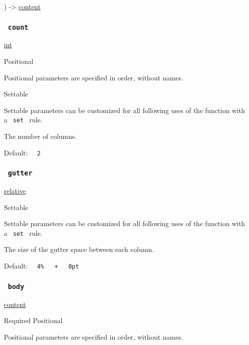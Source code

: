 ) -\textgreater{} \href{/docs/reference/foundations/content/}{content}

\subsubsection{\texorpdfstring{\texttt{\ count\ }}{ count }}\label{parameters-count}

\href{/docs/reference/foundations/int/}{int}

{{ Positional }}

\label{parameters-count-positional-tooltip}
Positional parameters are specified in order, without names.

{{ Settable }}

\label{parameters-count-settable-tooltip}
Settable parameters can be customized for all following uses of the
function with a \texttt{\ set\ } rule.

The number of columns.

Default: \texttt{\ }{\texttt{\ 2\ }}\texttt{\ }

\subsubsection{\texorpdfstring{\texttt{\ gutter\ }}{ gutter }}\label{parameters-gutter}

\href{/docs/reference/layout/relative/}{relative}

{{ Settable }}

\label{parameters-gutter-settable-tooltip}
Settable parameters can be customized for all following uses of the
function with a \texttt{\ set\ } rule.

The size of the gutter space between each column.

Default:
\texttt{\ }{\texttt{\ 4\%\ }}\texttt{\ }{\texttt{\ +\ }}\texttt{\ }{\texttt{\ 0pt\ }}\texttt{\ }

\subsubsection{\texorpdfstring{\texttt{\ body\ }}{ body }}\label{parameters-body}

\href{/docs/reference/foundations/content/}{content}

{Required} {{ Positional }}

\label{parameters-body-positional-tooltip}
Positional parameters are specified in order, without names.

